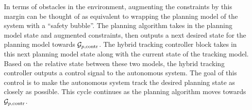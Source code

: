 In terms of obstacles in the environment, augmenting the constraints by this margin can be thought of as equivalent to wrapping the planning model of the system with a ``safety bubble''. 
The planning algorithm takes in the planning model state and augmented constraints, then outputs a next desired state for the planning model towards $\mathcal G_{p,\text{contr}}$.
The hybrid tracking controller block takes in this next planning model state along with the current state of the tracking model.
Based on the relative state between these two models, the hybrid tracking controller outputs a control signal to the autonomous system. 
The goal of this control is to make the autonomous system track the desired planning state as closely as possible.
This cycle continues as the planning algorithm moves towards $\mathcal G_{p,\text{contr}}$.




